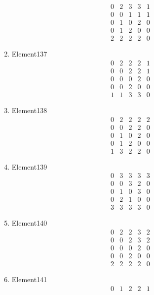 \documentclass[12pt]{article}
\begin{document}
\begin{multicols}{3}
\begin{enumerate}
\begin{equation*}
\begin{array}{ccccc}
0&2&3&3&1\\
0&0&1&1&1\\
0&1&0&2&0\\
0&1&2&0&0\\
2&2&2&2&0
\end{array}
\end{equation*}
\item Element137
\begin{equation*}
\begin{array}{ccccc}
0&2&2&2&1\\
0&0&2&2&1\\
0&0&0&2&0\\
0&0&2&0&0\\
1&1&3&3&0
\end{array}
\end{equation*}
\item Element138
\begin{equation*}
\begin{array}{ccccc}
0&2&2&2&2\\
0&0&2&2&0\\
0&1&0&2&0\\
0&1&2&0&0\\
1&3&2&2&0
\end{array}
\end{equation*}
\item Element139
\begin{equation*}
\begin{array}{ccccc}
0&3&3&3&3\\
0&0&3&2&0\\
0&1&0&3&0\\
0&2&1&0&0\\
3&3&3&3&0
\end{array}
\end{equation*}
\item Element140
\begin{equation*}
\begin{array}{ccccc}
0&2&2&3&2\\
0&0&2&3&2\\
0&0&0&2&0\\
0&0&2&0&0\\
2&2&2&2&0
\end{array}
\end{equation*}
\item Element141
\begin{equation*}
\begin{array}{ccccc}
0&1&2&2&1\\

\end{array}
\end{equation*}
\end{enumerate}
\end{multicols}
\end{document}
